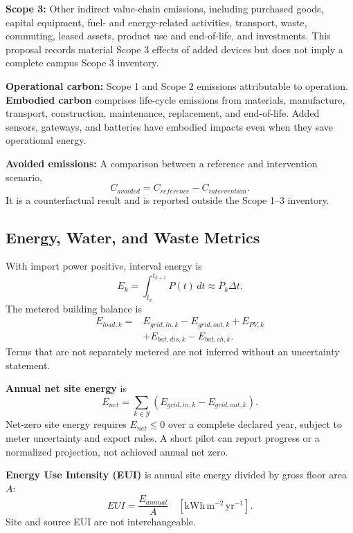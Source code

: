 \textbf{Scope 3:} Other indirect value-chain emissions, including purchased goods, capital equipment, fuel- and energy-related activities, transport, waste, commuting, leased assets, product use and end-of-life, and investments. This proposal records material Scope 3 effects of added devices but does not imply a complete campus Scope 3 inventory.

\textbf{Operational carbon:} Scope 1 and Scope 2 emissions attributable to operation. \textbf{Embodied carbon} comprises life-cycle emissions from materials, manufacture, transport, construction, maintenance, replacement, and end-of-life. Added sensors, gateways, and batteries have embodied impacts even when they save operational energy.

\textbf{Avoided emissions:} A comparison between a reference and intervention scenario,
\begin{equation}
	C_{avoided}=C_{reference}-C_{intervention}.
\end{equation}
It is a counterfactual result and is reported outside the Scope 1--3 inventory.

\subsection{Energy, Water, and Waste Metrics}

With import power positive, interval energy is
\begin{equation}
	E_k=\int_{t_k}^{t_{k+1}}P(t)\,dt\approx \bar{P}_k\Delta t.
\end{equation}
The metered building balance is
\begin{align}
	E_{load,k}={} & E_{grid,in,k}-E_{grid,out,k}+E_{PV,k}\nonumber \\
	              & +E_{bat,dis,k}-E_{bat,ch,k}.
	\label{eq:energy-balance}
\end{align}
Terms that are not separately metered are not inferred without an uncertainty statement.

\textbf{Annual net site energy} is
\begin{equation}
	E_{net}=\sum_{k\in\mathcal{Y}}(E_{grid,in,k}-E_{grid,out,k}).
	\label{eq:net-site}
\end{equation}
Net-zero site energy requires $E_{net}\leq0$ over a complete declared year, subject to meter uncertainty and export rules. A short pilot can report progress or a normalized projection, not achieved annual net zero.

\textbf{Energy Use Intensity (EUI)} is annual site energy divided by gross floor area $A$:
\begin{equation}
	EUI=\frac{E_{annual}}{A}\quad[\mathrm{kWh\,m^{-2}\,yr^{-1}}].
\end{equation}
Site and source EUI are not interchangeable.

